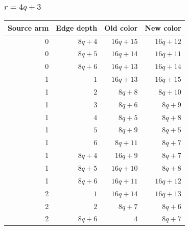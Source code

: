 \subsubsection[r=4q+3]{$r=4q+3$}
\begin{longtable}{rrrr}
Source arm & Edge depth & Old color & New color\\\hline\endhead
0 & $8q+4$ & $16q+15$ & $16q+12$\\
0 & $8q+5$ & $16q+14$ & $16q+11$\\
0 & $8q+6$ & $16q+13$ & $16q+14$\\
1 & $1$ & $16q+13$ & $16q+15$\\
1 & $2$ & $8q+8$ & $8q+10$\\
1 & $3$ & $8q+6$ & $8q+9$\\
1 & $4$ & $8q+5$ & $8q+8$\\
1 & $5$ & $8q+9$ & $8q+5$\\
1 & $6$ & $8q+11$ & $8q+7$\\
1 & $8q+4$ & $16q+9$ & $8q+7$\\
1 & $8q+5$ & $16q+10$ & $8q+8$\\
1 & $8q+6$ & $16q+11$ & $16q+12$\\
2 & $1$ & $16q+14$ & $16q+13$\\
2 & $2$ & $8q+7$ & $8q+6$\\
2 & $8q+6$ & $4$ & $8q+7$\\
\end{longtable}
